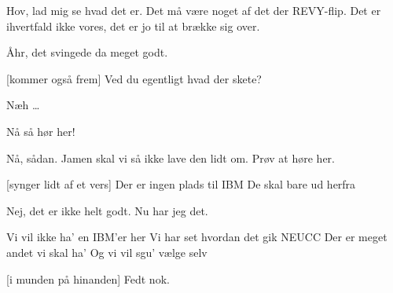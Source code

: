 \documentclass[a4paper,11pt]{article}
\begin{document}
\begin{sketch}

 Hov, lad mig se hvad det er.   Det må være noget af det der REVY-flip.  Det er ihvertfald ikke vores, det er jo til at brække sig over.

 Åhr, det svingede da meget godt. 

[kommer også frem] Ved du egentligt hvad der skete?

 Næh \ldots {}

 Nå så hør her!


 Nå, sådan.  Jamen skal vi så ikke lave den lidt om.  Prøv at høre her.

[synger lidt af et vers] Der er ingen plads til IBM
  De skal bare ud herfra

 Nej, det er ikke helt godt.  Nu har jeg det.

 Vi vil ikke ha' en IBM'er her
  Vi har set hvordan det gik NEUCC
  Der er meget andet vi skal ha'
  Og vi vil sgu' vælge selv

[i munden på hinanden] Fedt nok.


\end{sketch}
\end{document}
